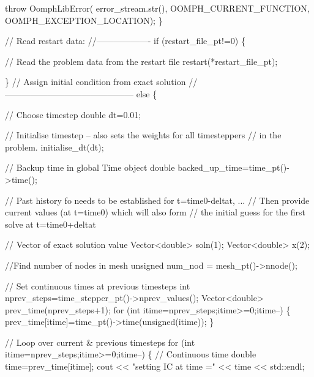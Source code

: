 \begin{DoxyCodeInclude}
   \textcolor{keywordflow}{throw} OomphLibError( 
    error\_stream.str(),
    OOMPH\_CURRENT\_FUNCTION,
    OOMPH\_EXCEPTION\_LOCATION);
  \}


 \textcolor{comment}{// Read restart data:}
 \textcolor{comment}{//-------------------}
 \textcolor{keywordflow}{if} (restart\_file\_pt!=0)
  \{

   \textcolor{comment}{// Read the problem data from the restart file}
   restart(*restart\_file\_pt);

  \}
 \textcolor{comment}{// Assign initial condition from exact solution}
 \textcolor{comment}{//---------------------------------------------}
 \textcolor{keywordflow}{else}
  \{
   
   \textcolor{comment}{// Choose timestep}
   \textcolor{keywordtype}{double} dt=0.01;
   
   \textcolor{comment}{// Initialise timestep -- also sets the weights for all timesteppers}
   \textcolor{comment}{// in the problem.}
   initialise\_dt(dt);
   
   \textcolor{comment}{// Backup time in global Time object}
   \textcolor{keywordtype}{double} backed\_up\_time=time\_pt()->time();
   
   \textcolor{comment}{// Past history fo needs to be established for t=time0-deltat, ...}
   \textcolor{comment}{// Then provide current values (at t=time0) which will also form}
   \textcolor{comment}{// the initial guess for the first solve at t=time0+deltat}
   
   \textcolor{comment}{// Vector of exact solution value}
   Vector<double> soln(1);
   Vector<double> x(2);
   
   \textcolor{comment}{//Find number of nodes in mesh}
   \textcolor{keywordtype}{unsigned} num\_nod = mesh\_pt()->nnode();
   
   \textcolor{comment}{// Set continuous times at previous timesteps}
   \textcolor{keywordtype}{int} nprev\_steps=time\_stepper\_pt()->nprev\_values();
   Vector<double> prev\_time(nprev\_steps+1);
   \textcolor{keywordflow}{for} (\textcolor{keywordtype}{int} itime=nprev\_steps;itime>=0;itime--)
    \{
     prev\_time[itime]=time\_pt()->time(\textcolor{keywordtype}{unsigned}(itime));
    \} 
   
   \textcolor{comment}{// Loop over current & previous timesteps}
   \textcolor{keywordflow}{for} (\textcolor{keywordtype}{int} itime=nprev\_steps;itime>=0;itime--)
    \{
     \textcolor{comment}{// Continuous time}
     \textcolor{keywordtype}{double} time=prev\_time[itime];
     cout << \textcolor{stringliteral}{"setting IC at time ="} << time << std::endl;
     

\end{DoxyCodeInclude}
